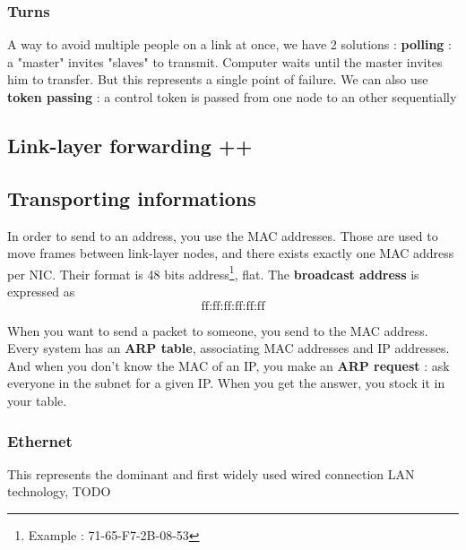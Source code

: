 \documentclass[12pt,a4paper]{article}
\begin{document}
\subsubsection{Turns}
A way to avoid multiple people on a link at once, we have 2 solutions : \textbf{polling} : a "master" invites "slaves" to transmit. Computer waits until the master invites him to transfer. But this represents a single point of failure. We can also use \textbf{token passing} : a control token is passed from one node to an other sequentially

\subsection{Link-layer forwarding ++}
\subsection{Transporting informations}
In order to send to an address, you use the MAC addresses. Those are used to move frames between link-layer nodes, and there exists exactly one MAC address per NIC. Their format is 48 bits address\footnote{Example : 71-65-F7-2B-08-53}, flat. The \textbf{broadcast address} is expressed as \[\text{ff:ff:ff:ff:ff:ff}\] 

When you want to send a packet to someone, you send to the MAC address. Every system has an \textbf{ARP table}, associating MAC addresses and IP addresses. And when you don't know the MAC of an IP, you make an \textbf{ARP request} : ask everyone in the subnet for a given IP. When you get the answer, you stock it in your table.
\subsubsection{Ethernet}
This represents the dominant and first widely used  wired connection LAN technology, 
TODO
\end{document}
